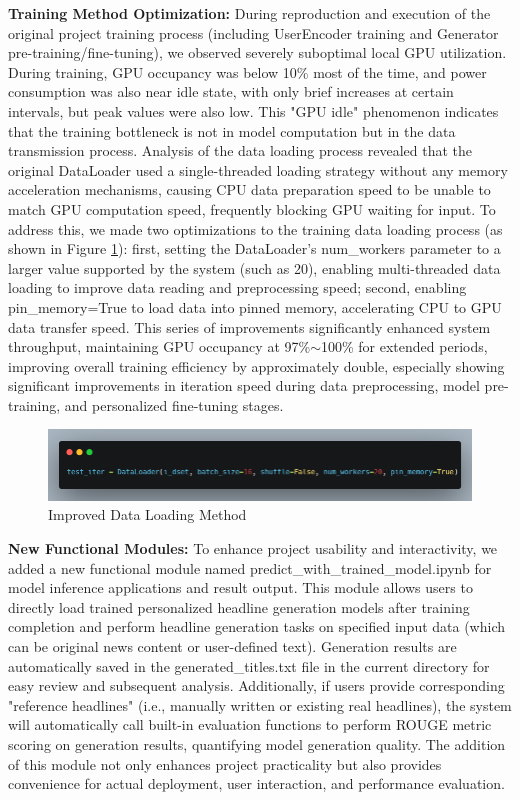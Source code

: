 \documentclass[10pt,a4paper]{article}
\begin{document}
\textbf{Training Method Optimization:}
During reproduction and execution of the original project training process (including UserEncoder training and Generator pre-training/fine-tuning), we observed severely suboptimal local GPU utilization. During training, GPU occupancy was below 10\% most of the time, and power consumption was also near idle state, with only brief increases at certain intervals, but peak values were also low. This "GPU idle" phenomenon indicates that the training bottleneck is not in model computation but in the data transmission process. Analysis of the data loading process revealed that the original DataLoader used a single-threaded loading strategy without any memory acceleration mechanisms, causing CPU data preparation speed to be unable to match GPU computation speed, frequently blocking GPU waiting for input. To address this, we made two optimizations to the training data loading process (as shown in Figure \ref{fig:data_loader}): first, setting the DataLoader's num\_workers parameter to a larger value supported by the system (such as 20), enabling multi-threaded data loading to improve data reading and preprocessing speed; second, enabling pin\_memory=True to load data into pinned memory, accelerating CPU to GPU data transfer speed. This series of improvements significantly enhanced system throughput, maintaining GPU occupancy at 97\%$\sim$100\% for extended periods, improving overall training efficiency by approximately double, especially showing significant improvements in iteration speed during data preprocessing, model pre-training, and personalized fine-tuning stages.

\begin{figure}[H]
  \centering
  \includegraphics[width=15cm]{fig/dataloader.png}
  \caption{Improved Data Loading Method}\label{fig:data_loader}
\end{figure}

\textbf{New Functional Modules:}
To enhance project usability and interactivity, we added a new functional module named predict\_with\_trained\_model.ipynb for model inference applications and result output. This module allows users to directly load trained personalized headline generation models after training completion and perform headline generation tasks on specified input data (which can be original news content or user-defined text). Generation results are automatically saved in the generated\_titles.txt file in the current directory for easy review and subsequent analysis. Additionally, if users provide corresponding "reference headlines" (i.e., manually written or existing real headlines), the system will automatically call built-in evaluation functions to perform ROUGE metric scoring on generation results, quantifying model generation quality. The addition of this module not only enhances project practicality but also provides convenience for actual deployment, user interaction, and performance evaluation.
\end{document}

